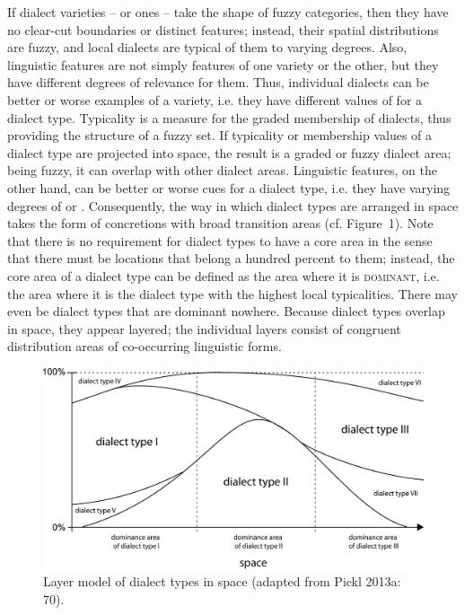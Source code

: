 \documentclass[output=paper]{LSP/langsci}
\begin{document}
If dialect varieties –  or  ones – take the shape of fuzzy categories, then they have no clear-cut boundaries or distinct features; instead, their spatial distributions are fuzzy, and local dialects are typical of them to varying degrees. Also, linguistic features are not simply features of one variety or the other, but they have different degrees of relevance for them. Thus, individual dialects can be better or worse examples of a variety, i.e. they have different values of \textsc{} for a dialect type. Typicality is a measure for the graded membership of dialects, thus providing the structure of a fuzzy set. If typicality or membership values of a dialect type are projected into space, the result is a graded or fuzzy dialect area; being fuzzy, it can overlap with other dialect areas. Linguistic features, on the other hand, can be better or worse cues for a dialect type, i.e. they have varying degrees of  or \textsc{}. Consequently, the way in which dialect types are arranged in space takes the form of concretions with broad transition areas (cf. Figure~1). Note that there is no requirement for dialect types to have a core area in the sense that there must be locations that belong a hundred percent to them; instead, the core area of a dialect type can be defined as the area where it is \textsc{dominant}, i.e. the area where it is the dialect type with the highest local typicalities. There may even be dialect types that are dominant nowhere. Because dialect types overlap in space, they appear layered; the individual layers consist of congruent distribution areas of co-occurring linguistic forms.

\begin{figure}
\includegraphics[width=\textwidth]{illustrations/pickl_fig1}
\caption{Layer model of dialect types in space (adapted from Pickl 2013a: 70).}
\label{fig:pickl:1}
\end{figure}
\end{document}
